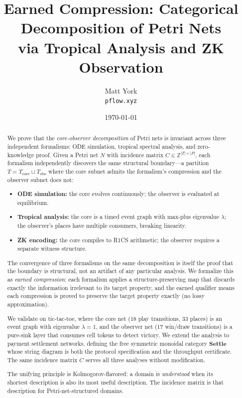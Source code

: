 \documentclass[11pt,a4paper]{article}
\title{Earned Compression: Categorical Decomposition of Petri Nets\\
via Tropical Analysis and ZK Observation}
\author{
  Matt York\\
  \texttt{pflow.xyz}
}
\date{\today}
\newcommand{\Z}{\mathbb{Z}}
\newcommand{\Settle}{\mathbf{Settle}}
\begin{document}
\maketitle

\begin{abstract}
We prove that the \emph{core-observer decomposition} of Petri nets is invariant across three independent formalisms: ODE simulation, tropical spectral analysis, and zero-knowledge proof.
Given a Petri net $N$ with incidence matrix $C \in \Z^{|T| \times |P|}$, each formalism independently discovers the same structural boundary---a partition $T = T_{\mathrm{core}} \sqcup T_{\mathrm{obs}}$ where the core subnet admits the formalism's compression and the observer subnet does not:
\begin{itemize}
  \item \textbf{ODE simulation:} the core evolves continuously; the observer is evaluated at equilibrium.
  \item \textbf{Tropical analysis:} the core is a timed event graph with max-plus eigenvalue $\lambda$; the observer's places have multiple consumers, breaking linearity.
  \item \textbf{ZK encoding:} the core compiles to R1CS arithmetic; the observer requires a separate witness structure.
\end{itemize}

The convergence of three formalisms on the same decomposition is itself the proof that the boundary is structural, not an artifact of any particular analysis.
We formalize this as \emph{earned compression}: each formalism applies a structure-preserving map that discards exactly the information irrelevant to its target property, and the earned qualifier means each compression is proved to preserve the target property exactly (no lossy approximation).

We validate on tic-tac-toe, where the core net (18 play transitions, 33 places) is an event graph with eigenvalue $\lambda = 1$, and the observer net (17 win/draw transitions) is a pure-sink layer that consumes cell tokens to detect victory.
We extend the analysis to payment settlement networks, defining the free symmetric monoidal category $\Settle$ whose string diagram is both the protocol specification and the throughput certificate.
The same incidence matrix $C$ serves all three analyses without modification.

The unifying principle is Kolmogorov-flavored: a domain is \emph{understood} when its shortest description is also its most useful description.
The incidence matrix is that description for Petri-net-structured domains.
\end{abstract}
\end{document}
